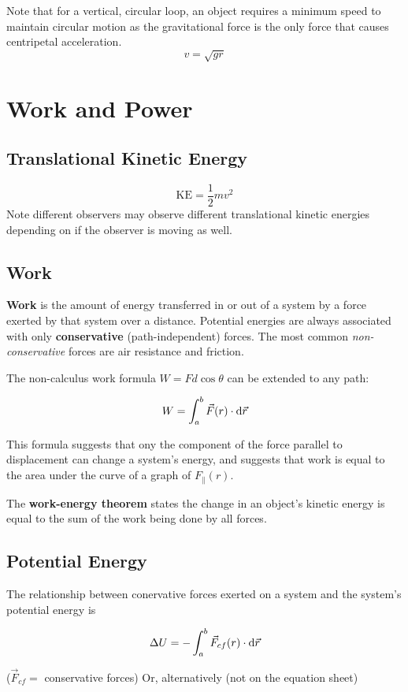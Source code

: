 \documentclass{article}
\begin{document}
Note that for a vertical, circular loop, an object requires a minimum speed to maintain circular motion as the gravitational force is the only force that causes centripetal acceleration.
\[v = \sqrt{gr}\]
\newpage

\section{Work and Power}

\subsection{Translational Kinetic Energy}
\[\textrm{KE} = \frac{1}{2} mv^2\]
Note different observers may observe different translational kinetic energies depending on if the observer is moving as well.

\subsection{Work}
\textbf{Work} is the amount of energy transferred in or out of a system by a force exerted by that system over a distance.
Potential energies are always associated with only \textbf{conservative} (path-independent) forces.
The most common \textit{non-conservative} forces are air resistance and friction.

The non-calculus work formula $W = Fd \cos \theta$ can be extended to any path:

\[W = \int_{a}^{b} \vec{F}(r) \cdot \odif{\vec{r}}\]

This formula suggests that ony the component of the force parallel to displacement can change a system's energy, and suggests that work is equal to the area under the curve of a graph of $F_{\parallel}(r)$.

The \textbf{work-energy theorem} states the change in an object's kinetic energy is equal to the sum of the work being done by all forces. 

\subsection{Potential Energy}

The relationship between conervative forces exerted on a system and the system's potential energy is

\[\Delta U = - \int_{a}^{b} \vec{F}_{cf}(r) \cdot \odif{\vec{r}}\]

($\vec{F}_{cf} = $ conservative forces) Or, alternatively (not on the equation sheet)
\end{document}
